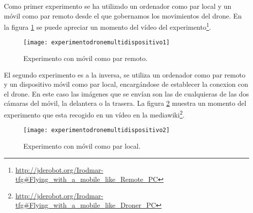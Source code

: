 Como primer experimento se ha utilizado un ordenador como par local y un móvil como par remoto desde el que gobernamos los movimientos del drone. En la figura \ref{fig:experimentodronemultidispositivo1} se puede apreciar un momento del vídeo del experimento\footnote{\url{http://jderobot.org/Irodmar-tfg\#Flying\_with\_a\_mobile\_like\_Remote\_PC}}.\\

\begin{figure}[h!]
\centering
\texttt{[image: experimentodronemultidispositivo1]}
\caption{Experimento con móvil como par remoto.}
\label{fig:experimentodronemultidispositivo1}
\end{figure}

El segundo experimento es a la inversa, se utiliza un ordenador como par remoto y un dispositivo móvil como par local, encargándose de establecer la conexion con el drone. En este caso las imágenes que se envían son las de cualquieras de las dos cámaras del móvil, la delantera o la trasera. La figura \ref{fig:experimentodronemultidispositivo2} muestra un momento del experimento que esta recogido en un vídeo en la mediawiki\footnote{\url{http://jderobot.org/Irodmar-tfg#Flying_with_a_mobile_like_Droner_PC}}.\\

\begin{figure}[h!]
\centering
\texttt{[image: experimentodronemultidispositivo2]}
\caption{Experimento con móvil como par local.}
\label{fig:experimentodronemultidispositivo2}
\end{figure}